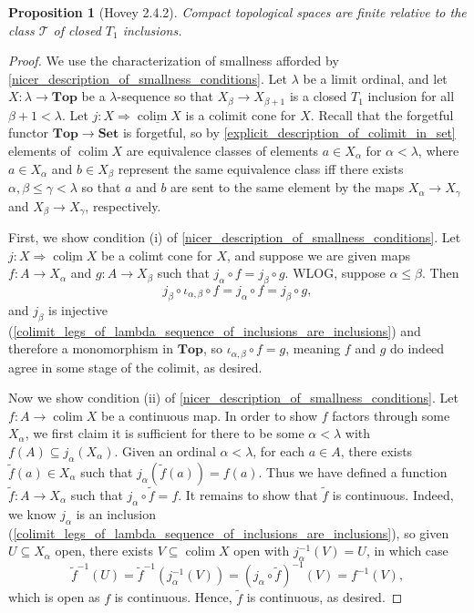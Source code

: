 \documentclass{amsart}
\theoremstyle{plain}
\newtheorem{proposition}[theorem]{Proposition}
\theoremstyle{definition}
\newcommand{\Top}{\mbf{Top}}
\newcommand{\Set}{\mbf{Set}}
\newcommand{\sseq}{\subseteq}
\newcommand{\wt}{\widetilde}
\newcommand{\0}{\mathbf{0}}
\newcommand{\cT}{\mathcal T}
\newcommand{\mbf}[1]{\mathbf{#1}}
\newcommand{\ul}{\underline}
\renewcommand{\(}{\left(}
\renewcommand{\)}{\right)}
\DeclareMathOperator*{\colim}{colim}
\begin{document}
\begin{proposition}[Hovey 2.4.2]\label{2.4.2}
  Compact topological spaces are finite relative to the class $\cT$ of closed $T_1$ inclusions.
\end{proposition}
\begin{proof}
  We use the characterization of smallness afforded by \autoref{nicer_description_of_smallness_conditions}. Let $\lambda$ be a limit ordinal, and let $X:\lambda\to\Top$ be a $\lambda$-sequence so that $X_\beta\to X_{\beta+1}$ is a closed $T_1$ inclusion for all $\beta+1<\lambda$. Let $j:X\Rightarrow\ul{\colim X}$ is a colimit cone for $X$. Recall that the forgetful functor $\Top\to\Set$ is forgetful, so by \autoref{explicit_description_of_colimit_in_set} elements of $\colim X$ are equivalence classes of elements $a\in X_\alpha$ for $\alpha<\lambda$, where $a\in X_\alpha$ and $b\in X_\beta$ represent the same equivalence class iff there exists $\alpha,\beta\leq\gamma<\lambda$ so that $a$ and $b$ are sent to the same element by the maps $X_\alpha\to X_\gamma$ and $X_\beta\to X_\gamma$, respectively.

  First, we show condition (i) of \autoref{nicer_description_of_smallness_conditions}. Let $j:X\Rightarrow\ul{\colim X}$ be a colimt cone for $X$, and suppose we are given maps $f:A\to X_\alpha$ and $g:A\to X_\beta$ such that $j_\alpha\circ f=j_\beta\circ g$. WLOG, suppose $\alpha\leq\beta$. Then
  \[j_\beta\circ\iota_{\alpha,\beta}\circ f=j_\alpha\circ f=j_{\beta}\circ g,\]
  and $j_\beta$ is injective (\autoref{colimit_legs_of_lambda_sequence_of_inclusions_are_inclusions}) and therefore a monomorphism in $\Top$, so $\iota_{\alpha,\beta}\circ f=g$, meaning $f$ and $g$ do indeed agree in some stage of the colimit, as desired.

  Now we show condition (ii) of \autoref{nicer_description_of_smallness_conditions}. Let $f:A\to\colim X$ be a continuous map. In order to show $f$ factors through some $X_\alpha$, we first claim it is sufficient for there to be some $\alpha<\lambda$ with $f(A)\sseq j_\alpha(X_\alpha)$. Given an ordinal $\alpha<\lambda$, for each $a\in A$, there exists $\wt f(a)\in X_\alpha$ such that $j_\alpha(\wt f(a))=f(a)$. Thus we have defined a function $\wt f:A\to X_\alpha$ such that $j_\alpha\circ\wt f=f$. It remains to show that $\wt f$ is continuous. Indeed, we know $j_\alpha$ is an inclusion (\autoref{colimit_legs_of_lambda_sequence_of_inclusions_are_inclusions}), so given $U\sseq X_\alpha$ open, there exists $V\sseq\colim X$ open with $j_\alpha^{-1}(V)=U$, in which case
  \[\wt f^{-1}(U)=\wt f^{-1}(j_\alpha^{-1}(V))=(j_\alpha\circ\wt f)^{-1}(V)=f^{-1}(V),\]
  which is open as $f$ is continuous. Hence, $\wt f$ is continuous, as desired.


\end{proof}
\end{document}
